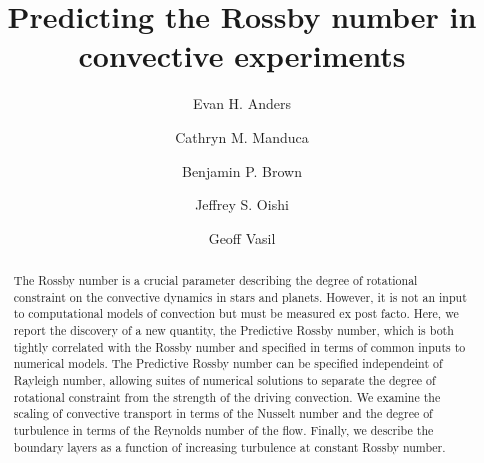 \documentclass[twocolumn, amsmath, amsfonts, amssymb]{aastex62}
\begin{document}
\newcommand{\AB}{\citetalias{anders&brown2017}}

\title{Predicting the Rossby number in convective experiments}


\author{Evan H. Anders}
\author{Cathryn M. Manduca}
\author{Benjamin P. Brown}
\author{Jeffrey S. Oishi}
\author{Geoff Vasil}


\begin{abstract}
  The Rossby number is a crucial parameter describing the degree of rotational constraint on the convective dynamics in stars and planets. However, it is not an input to computational models of convection but must be measured ex post facto. Here, we report the discovery of a new quantity, the Predictive Rossby number, which is both tightly correlated with the Rossby number and specified in terms of common inputs to numerical models. The Predictive Rossby number can be specified independeint of Rayleigh number, allowing suites of numerical solutions to separate the degree of rotational constraint from the strength of the driving convection.  We examine the scaling of convective transport in terms of the Nusselt number and the degree of turbulence in terms of the Reynolds number of the flow. Finally, we describe the boundary layers as a function of increasing turbulence at constant Rossby number.
\end{abstract}


\end{document}
